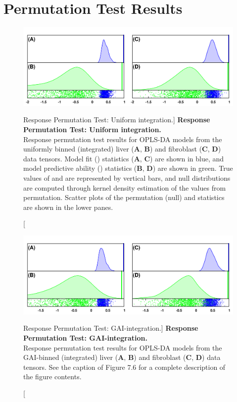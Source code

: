 \section{Permutation Test Results}

\begin{figure}[ht!]
\includegraphics[width=6.5in]{figs/gaibin/06-perm-unif-int.png}
\caption
      [Response Permutation Test: Uniform integration.]{
  {\bf Response Permutation Test: Uniform integration.}
  \\
  Response permutation test results for OPLS-DA models from the uniformly
  binned (integrated) liver ({\bf A}, {\bf B}) and fibroblast
  ({\bf C}, {\bf D}) data tensors. Model fit (\rsqy{}) statistics
  ({\bf A}, {\bf C}) are shown in blue, and model predictive ability (\qsq{})
  statistics ({\bf B}, {\bf D}) are shown in green. True values of \rsqy{} and
  \qsq{} are represented by vertical bars, and null distributions are computed
  through kernel density estimation of the values from permutation. Scatter
  plots of the permutation (null) \rsqy{} and \qsq{} statistics are shown in
  the lower panes.
}
\end{figure}

\begin{figure}[ht!]
\includegraphics[width=6.5in]{figs/gaibin/07-perm-gai-int.png}
\caption
      [Response Permutation Test: GAI-integration.]{
  {\bf Response Permutation Test: GAI-integration.}
  \\
  Response permutation test results for OPLS-DA models from the GAI-binned
  (integrated) liver ({\bf A}, {\bf B}) and fibroblast
  ({\bf C}, {\bf D}) data tensors. See the caption of Figure 7.6 for a
  complete description of the figure contents.
}
\end{figure}

